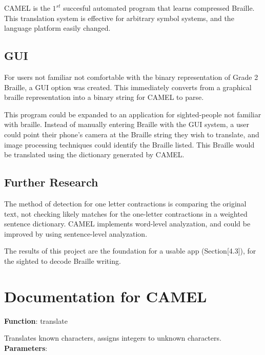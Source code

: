 \documentclass[26pt]{article}
\newcommand*{\code}{\fontfamily{pcr}\selectfont}
\begin{document}
CAMEL is the $1^{st}$ succesful automated program that learns compressed Braille. This translation system is effective for arbitrary symbol systems, and the language platform easily changed.

\subsection{GUI}
For users not familiar not comfortable with the binary representation of Grade 2 Braille, a GUI option was created. This immediately converts from a graphical braille representation into a binary string for CAMEL to parse.

This program could be expanded to an application for sighted-people not familiar with braille. Instead of manually entering Braille with the GUI system, a user could point their phone's camera at the Braille string they wish to translate, and image processing techniques could identify the Braille listed. This Braille would be translated using the dictionary generated by CAMEL.

\subsection{Further Research}
The method of detection for one letter contractions is comparing the original text, not checking likely matches for the one-letter contractions in a weighted sentence dictionary. CAMEL implements word-level analyzation, and could be improved by using sentence-level analyzation. 

The results of this project are the foundation for a usable app (Section[4.3]), for the sighted to decode Braille writing.

\clearpage

\section{Documentation for CAMEL}






\textbf{Function}: {\code translate}

Translates known characters, assigns integers to unknown characters. \newline\textbf{Parameters}: 
\end{document}
